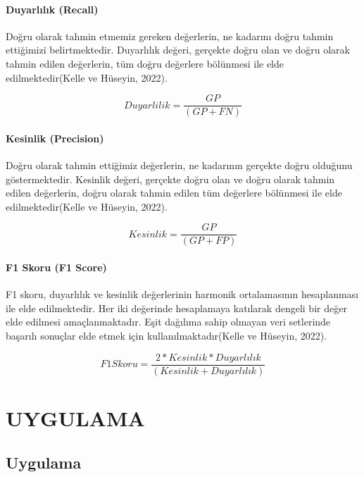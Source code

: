 \documentclass[12pt,twoside]{deuthesis}
\begin{document}
\hypertarget{duyarlux131lux131k-recall}{%
\subsubsection{Duyarlılık (Recall)}\label{duyarlux131lux131k-recall}}

Doğru olarak tahmin etmemiz gereken değerlerin, ne kadarını doğru tahmin ettiğimizi belirtmektedir. Duyarlılık değeri, gerçekte doğru olan ve doğru olarak tahmin edilen değerlerin, tüm doğru değerlere bölünmesi ile elde edilmektedir(Kelle ve Hüseyin, 2022).

\[Duyarlilik =  \frac{GP}{(GP + FN)}\]

\hypertarget{kesinlik-precision}{%
\subsubsection{Kesinlik (Precision)}\label{kesinlik-precision}}

Doğru olarak tahmin ettiğimiz değerlerin, ne kadarının gerçekte doğru olduğunu göstermektedir. Kesinlik değeri, gerçekte doğru olan ve doğru olarak tahmin edilen değerlerin, doğru olarak tahmin edilen tüm değerlere bölünmesi ile elde edilmektedir(Kelle ve Hüseyin, 2022).

\[Kesinlik =  \frac{GP}{(GP + FP)}\]

\hypertarget{f1-skoru-f1-score}{%
\subsubsection{F1 Skoru (F1 Score)}\label{f1-skoru-f1-score}}

F1 skoru, duyarlılık ve kesinlik değerlerinin harmonik ortalamasının hesaplanması ile elde edilmektedir. Her iki değerinde hesaplamaya katılarak dengeli bir değer elde edilmesi amaçlanmaktadır. Eşit dağılıma sahip olmayan veri setlerinde başarılı sonuçlar elde etmek için kullanılmaktadır(Kelle ve Hüseyin, 2022).

\[ F1 Skoru = \frac{2 * Kesinlik * Duyarlılık}{(Kesinlik + Duyarlılık)} \]

\hypertarget{ref-labels}{%
\chapter{UYGULAMA}\label{ref-labels}}

\hypertarget{uygulama}{%
\section{Uygulama}\label{uygulama}}
\end{document}
